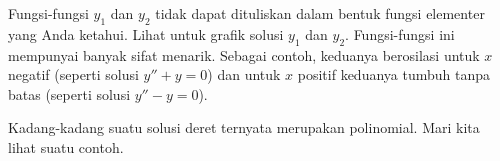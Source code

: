 \begin{example}
\begin{myfig}
\capstart
{}
\caption{Dua solusi $y_1$ dan $y_2$ untuk persamaan Airy.\label{ps:airyfig}}
\end{myfig}
\end{example}
Fungsi-fungsi $y_1$ dan $y_2$ tidak dapat dituliskan dalam bentuk fungsi
elementer yang Anda ketahui. Lihat  untuk grafik
solusi $y_1$ dan $y_2$. Fungsi-fungsi ini mempunyai banyak sifat menarik.
Sebagai contoh, keduanya berosilasi untuk $x$ negatif
(seperti solusi $y''+y=0$) dan
untuk $x$ positif keduanya tumbuh tanpa batas (seperti solusi $y''-y=0$).

\medskip

Kadang-kadang suatu solusi deret ternyata merupakan polinomial.
Mari kita lihat suatu contoh.

